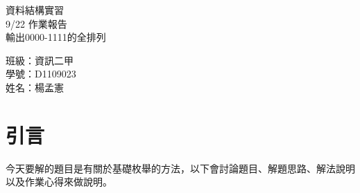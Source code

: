 \documentclass[12pt, a4paper]{article}
\begin{document}
  \begin{center}
    {\Huge 資料結構實習} \\[2.5cm]
    {\Huge 9/22 作業報告} \\[1.5cm]
    {\Huge 輸出0000-1111的全排列} \\ [4.5cm]
    \hspace{.6in}
    \begin{minipage}[t]{.4\linewidth}
      {\Large 班級：資訊二甲}\\[0.5cm]
      {\Large 學號：D1109023}\\[0.5cm]
      {\Large 姓名：楊孟憲}
    \end{minipage}    
  \end{center}

  \newpage

  \begin{samepage}
    \fontsize{18pt}{20pt} \selectfont  
    \tableofcontents
    \normalfont
  \end{samepage}
  
  \newpage


  \section{\fontsize{20pt}{22pt}\selectfont 引言}
  \begin{samepage}
    \fontsize{16pt}{18pt} \selectfont
    今天要解的題目是有關於基礎枚舉的方法，以下會討論題目、解題思路、解法說明以及作業心得來做說明。
  \end{samepage}

\end{document}
